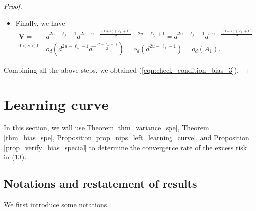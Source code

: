 \documentclass{article}
\theoremstyle{plain}
\theoremstyle{definition}
\theoremstyle{remark}
\begin{document}
\begin{appendix}
\begin{proof}
\begin{itemize}
    \item Finally, we have
    \begin{align*}
        \mathbf{V} =&~  d^{2u-\ell_{\lambda}-1}  d^{2u-\gamma -\frac{(1+s)(\ell_{\lambda}+1)}{2} - 2u + \ell_{\lambda} + 1} = d^{2u-\ell_{\lambda}-1} d^{-\gamma + \frac{(1-s)(\ell_{\lambda}+1)}{2}}\\
        \overset{0<s<1}{=} &~ o_d(d^{2u-\ell_{\lambda}-1}d^{-\frac{2\gamma - \ell_{\lambda} - 1)}{2}}) = o_d(d^{2u-\ell_{\lambda}-1}) = o_d(A_1).
    \end{align*}
        
    

    
\end{itemize}
Combining all the above steps, we obtained (\ref{eqn:check_condition_bias_3}).    
\end{proof}





\section{Learning curve}\label{append_learning_curve}

In this section, we will use Theorem \ref{thm_variance_spe}, Theorem \ref{thm_bias_spe}, Proposition \ref{prop_nips_left_learning_curve}, and Proposition \ref{prop_verify_bias_special} to determine the convergence rate of the excess risk in (13). 


\subsection{Notations and restatement of results}

We first introduce some notations.



\end{appendix}
\end{document}
